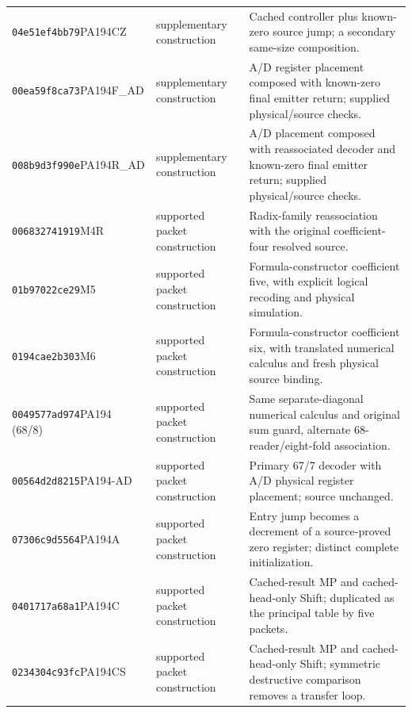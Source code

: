 {\begin{longtable}{@{}>{\raggedright\arraybackslash}p{}>{\raggedright\arraybackslash}p{}>{\raggedright\arraybackslash}p{}@{}}
\texttt{04e51ef4bb79}\newline PA194CZ & supplementary construction & Cached controller plus known-zero source jump; a secondary same-size composition.\\
\texttt{00ea59f8ca73}\newline PA194F\_AD & supplementary construction & A/D register placement composed with known-zero final emitter return; supplied physical/source checks.\\
\texttt{008b9d3f990e}\newline PA194R\_AD & supplementary construction & A/D placement composed with reassociated decoder and known-zero final emitter return; supplied physical/source checks.\\
\texttt{006832741919}\newline M4R & supported packet construction & Radix-family reassociation with the original coefficient-four resolved source.\\
\texttt{01b97022ce29}\newline M5 & supported packet construction & Formula-constructor coefficient five, with explicit logical recoding and physical simulation.\\
\texttt{0194cae2b303}\newline M6 & supported packet construction & Formula-constructor coefficient six, with translated numerical calculus and fresh physical source binding.\\
\texttt{0049577ad974}\newline PA194 (68/8) & supported packet construction & Same separate-diagonal numerical calculus and original sum guard, alternate 68-reader/eight-fold association.\\
\texttt{00564d2d8215}\newline PA194-AD & supported packet construction & Primary 67/7 decoder with A/D physical register placement; source unchanged.\\
\texttt{07306c9d5564}\newline PA194A & supported packet construction & Entry jump becomes a decrement of a source-proved zero register; distinct complete initialization.\\
\texttt{0401717a68a1}\newline PA194C & supported packet construction & Cached-result MP and cached-head-only Shift; duplicated as the principal table by five packets.\\
\texttt{0234304c93fc}\newline PA194CS & supported packet construction & Cached-result MP and cached-head-only Shift; symmetric destructive comparison removes a transfer loop.\\

\end{longtable}}
